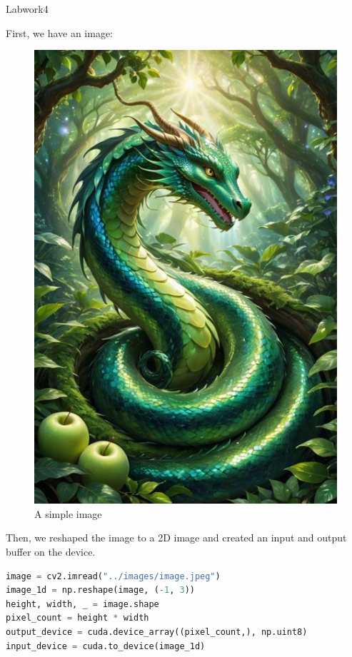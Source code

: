 \documentclass[12pt]{article}
\begin{document}
\begin{center}
    \vspace*{1.8cm}
    \Large
    Labwork4\\
\end{center}

\noindent
First, we have an image:
\begin{figure}[H]
\centering
    \includegraphics[height = 0.5\textheight, keepaspectratio]{images/image.jpeg}
    \caption{A simple image}
\end{figure}

\noindent
Then, we reshaped the image to a 2D image and created an input and output buffer on the device.

\begin{lstlisting}[language=Python]
image = cv2.imread("../images/image.jpeg")
image_1d = np.reshape(image, (-1, 3))
height, width, _ = image.shape
pixel_count = height * width
output_device = cuda.device_array((pixel_count,), np.uint8)
input_device = cuda.to_device(image_1d)
\end{lstlisting}
\end{document}
